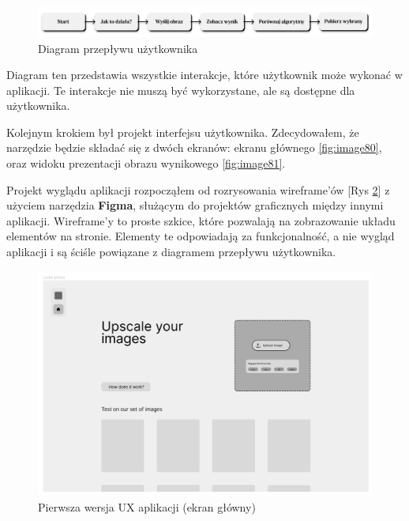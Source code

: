 \begin{figure}[ht]
    \centering
    \includegraphics[width=\linewidth]{Rozdziały/06.Aplikacja/Obrazy/user-flow.png}  
    \caption{Diagram przepływu użytkownika}
    \label{fig:image82}
\end{figure}

Diagram ten przedstawia wszystkie interakcje, które użytkownik może wykonać w aplikacji. Te interakcje nie muszą być wykorzystane, ale są dostępne dla użytkownika.

Kolejnym krokiem był projekt interfejsu użytkownika. Zdecydowałem, że narzędzie będzie składać się z dwóch ekranów: ekranu głównego \ref{fig:image80}, oraz widoku prezentacji obrazu wynikowego \ref{fig:image81}.

Projekt wyglądu aplikacji rozpocząłem od rozrysowania wireframe'ów [Rys \ref{fig:image83}] z użyciem narzędzia \textbf{Figma}, służącym do projektów graficznych między innymi aplikacji. Wireframe'y to proste szkice, które pozwalają na zobrazowanie układu elementów na stronie. Elementy te odpowiadają za funkcjonalność, a nie wygląd aplikacji i są ściśle powiązane z diagramem przepływu użytkownika.

\begin{figure}[ht]
    \centering
    \includegraphics[width=0.8\linewidth]{Rozdziały/06.Aplikacja/Obrazy/UX upload.png}  
    \caption{Pierwsza wersja UX aplikacji (ekran główny)}
    \label{fig:image83}
\end{figure}

